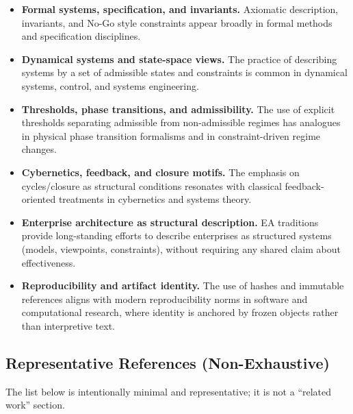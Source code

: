 \begin{itemize}
  \item \textbf{Formal systems, specification, and invariants.}
  Axiomatic description, invariants, and No-Go style constraints appear
  broadly in formal methods and specification disciplines.

  \item \textbf{Dynamical systems and state-space views.}
  The practice of describing systems by a set of admissible states and
  constraints is common in dynamical systems, control, and systems
  engineering.

  \item \textbf{Thresholds, phase transitions, and admissibility.}
  The use of explicit thresholds separating admissible from
  non-admissible regimes has analogues in physical phase transition
  formalisms and in constraint-driven regime changes.

  \item \textbf{Cybernetics, feedback, and closure motifs.}
  The emphasis on cycles/closure as structural conditions resonates with
  classical feedback-oriented treatments in cybernetics and systems
  theory.

  \item \textbf{Enterprise architecture as structural description.}
  EA traditions provide long-standing efforts to describe enterprises as
  structured systems (models, viewpoints, constraints), without requiring
  any shared claim about effectiveness.

  \item \textbf{Reproducibility and artifact identity.}
  The use of hashes and immutable references aligns with modern
  reproducibility norms in software and computational research, where
  identity is anchored by frozen objects rather than interpretive text.
\end{itemize}

\subsection*{Representative References (Non-Exhaustive)}

The list below is intentionally minimal and representative; it is not a
``related work'' section.

